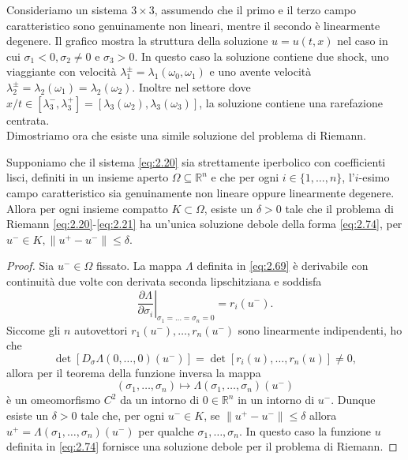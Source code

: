 Consideriamo un sistema $3\times 3$, assumendo che il primo e il terzo campo caratteristico sono genuinamente non lineari, mentre il secondo è linearmente degenere. Il grafico mostra la struttura della soluzione $u=u(t,x)$ nel caso in cui $\sigma_{1}<0, \sigma_{2}\neq 0$ e $\sigma_{3}>0$. In questo caso la soluzione contiene due shock, uno viaggiante con velocità $\lambda_{1}^{\pm}=\lambda_{1}(\omega_{0},\omega_{1})$ e uno avente velocità $\lambda_{2}^{\pm}=\lambda_{2}(\omega_{1})=\lambda_{2}(\omega_{2})$. Inoltre nel settore dove $x/t\in [\lambda_{3}^{-},\lambda_{3}^{+}]=[\lambda_{3}(\omega_{2}),\lambda_{3}(\omega_{3})]$, la soluzione contiene una rarefazione centrata.\\
Dimostriamo ora che esiste una simile soluzione del problema di Riemann.
\begin{teorema}
    Supponiamo che il sistema \eqref{eq:2.20} sia strettamente iperbolico con coefficienti lisci, definiti in un insieme aperto $\Omega\subseteq\mathbb{R}^{n}$ e che per ogni $i\in\{1,\ldots,n\}$, l'$i$-esimo campo caratteristico sia genuinamente non lineare oppure linearmente degenere.\\
    Allora per ogni insieme compatto $K\subset\Omega$, esiste un $\delta >0$ tale che il problema di Riemann \eqref{eq:2.20}-\eqref{eq:2.21} ha un'unica soluzione debole della forma \eqref{eq:2.74}, per $u^{-}\in K, \|u^{+}-u^{-}\|\leq\delta$.
\end{teorema}
\begin{proof}
    Sia $u^{-}\in\Omega$ fissato. La mappa $\Lambda$ definita in \eqref{eq:2.69} è derivabile con continuità due volte con derivata seconda lipschitziana e soddisfa
    \begin{equation}\label{eq:2.75}
        \left.\frac{\partial\Lambda}{\partial\sigma_{i}}\right|_{\sigma_{1}=\ldots=\sigma_{n}=0} = r_{i}(u^{-}).
    \end{equation}
    Siccome gli $n$ autovettori $r_{1}(u^{-}),\ldots,r_{n}(u^{-})$ sono linearmente indipendenti, ho che
    \begin{equation*}
            \det\left[ D_{\sigma}\Lambda(0,\ldots,0)(u^{-})\right]=\det\left[ r_{i}(u),\ldots,r_{n}(u) \right]\neq 0,
        \end{equation*}
    allora per il teorema della funzione inversa la mappa
    \begin{equation*}
        (\sigma_{1},\ldots,\sigma_{n})\mapsto\Lambda(\sigma_{1},\ldots,\sigma_{n})(u^{-})
    \end{equation*}
    è un omeomorfismo $C^{2}$ da un intorno di $0\in\mathbb{R}^{n}$ in un intorno di $u^{-}$. Dunque esiste un $\delta >0$ tale che, per ogni $u^{-}\in K$, se $\|u^{+}-u^{-}\|\leq\delta$ allora $u^{+}=\Lambda(\sigma_{1},\ldots,\sigma_{n})(u^{-})$ per qualche $\sigma_{1},\ldots,\sigma_{n}$. In questo caso la funzione $u$ definita in \eqref{eq:2.74} fornisce una soluzione debole per il problema di Riemann.
\end{proof}